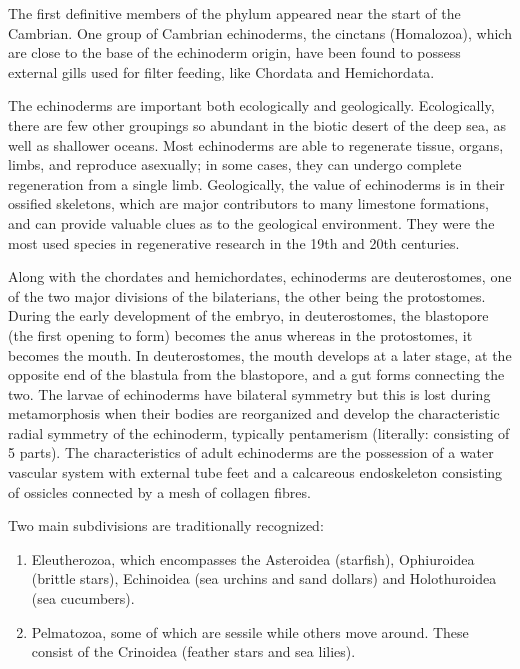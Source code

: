 \documentclass[]{book}
\providecommand{\tightlist}{%
  \setlength{\itemsep}{0pt}\setlength{\parskip}{0pt}}
\theoremstyle{definition}
\theoremstyle{definition}
\theoremstyle{definition}
\theoremstyle{remark}
\begin{document}
The first definitive members of the phylum appeared near the start of
the Cambrian. One group of Cambrian echinoderms, the cinctans
(Homalozoa), which are close to the base of the echinoderm origin, have
been found to possess external gills used for filter feeding, like
Chordata and Hemichordata.

The echinoderms are important both ecologically and geologically.
Ecologically, there are few other groupings so abundant in the biotic
desert of the deep sea, as well as shallower oceans. Most echinoderms
are able to regenerate tissue, organs, limbs, and reproduce asexually;
in some cases, they can undergo complete regeneration from a single
limb. Geologically, the value of echinoderms is in their ossified
skeletons, which are major contributors to many limestone formations,
and can provide valuable clues as to the geological environment. They
were the most used species in regenerative research in the 19th and 20th
centuries.

Along with the chordates and hemichordates, echinoderms are
deuterostomes, one of the two major divisions of the bilaterians, the
other being the protostomes. During the early development of the embryo,
in deuterostomes, the blastopore (the first opening to form) becomes the
anus whereas in the protostomes, it becomes the mouth. In deuterostomes,
the mouth develops at a later stage, at the opposite end of the blastula
from the blastopore, and a gut forms connecting the two. The larvae of
echinoderms have bilateral symmetry but this is lost during
metamorphosis when their bodies are reorganized and develop the
characteristic radial symmetry of the echinoderm, typically pentamerism
(literally: consisting of 5 parts). The characteristics of adult
echinoderms are the possession of a water vascular system with external
tube feet and a calcareous endoskeleton consisting of ossicles connected
by a mesh of collagen fibres.

Two main subdivisions are traditionally recognized:

\begin{enumerate}
\def\labelenumi{\arabic{enumi}.}
\tightlist
\item
  Eleutherozoa, which encompasses the Asteroidea (starfish), Ophiuroidea
  (brittle stars), Echinoidea (sea urchins and sand dollars) and
  Holothuroidea (sea cucumbers).
\item
  Pelmatozoa, some of which are sessile while others move around. These
  consist of the Crinoidea (feather stars and sea lilies).
\end{enumerate}
\end{document}
